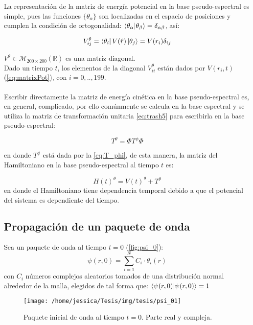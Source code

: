 La representación de la matriz de energía potencial en la base pseudo-espectral es simple, pues 
las funciones $\{\theta_{\alpha}\}$ son localizadas en el espacio de posiciones y cumplen la condición de ortogonalidad: $\bra{\theta_{\alpha}}\ket{\theta_{\beta}}= \delta_{\alpha \beta}$, así:

\begin{equation}
  \label{eq:V_DVR}
  V^{\theta}_{ij}= \bra{\theta_i}V(\hat{r})\ket{\theta_j}=V(r_i)\delta_{ij}
\end{equation}

$V^{\theta}\in \mathcal{M}_{200\times200}(\mathbb{R})$ es una matriz diagonal.
\\
Dado un tiempo $t$, los elementos de la diagonal $V^{\theta}_{ii}$ están dados por $V(r_i,t)$ (\autoref{eq:matrixPot}), con $i=0,..,199$.
\\
\\
Escribir directamente la matriz de energía cinética en la base pseudo-espectral es, en general, complicado, por ello comúnmente se calcula en la base espectral y se utiliza la matriz de transformación unitaria \autoref{eq:trash5} para escribirla en la base pseudo-espectral:

\begin{equation}
  \label{eq:trash6}
  T^{\theta} = \Phi T^{\phi} \Phi
\end{equation}

en donde $T^{\phi}$ está dada por la \autoref{eq:T_phi}, de esta manera, la matriz del Hamiltoniano en la base pseudo-espectral al tiempo $t$ es:

\begin{equation}
  \label{eq:H_DVR}
  H(t)^{\theta} = V(t)^{\theta}+T^{\theta}
\end{equation}
en donde el Hamiltoniano tiene dependencia temporal debido a que el potencial del sistema es dependiente del tiempo.

\subsection{Propagación de un paquete de onda}

Sea un paquete de onda al tiempo $t=0$ (\autoref{fig:psi_0}): 
\begin{equation}
  \label{eq:psi_0}
\psi(r,0)=\sum_{i=1}^{N}C_i \cdot \theta_{i}(r)
\end{equation}
con $C_i$ números complejos aleatorios tomados de una distribución normal alrededor de la malla, elegidos de tal forma que: $\bra{\psi(r,0)}\ket{\psi(r,0)}=1$
\begin{figure}[!htbp]
  \centering
  \texttt{[image: /home/jessica/Tesis/img/tesis/psi\_01]}
  \caption{Paquete inicial de onda al tiempo $t=0$. Parte real y compleja.}
  \label{fig:psi_0}
\end{figure}

